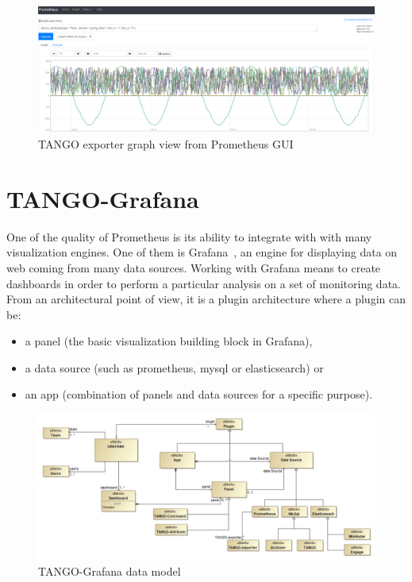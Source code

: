\documentclass[]{spie}  %
\begin{document}
\begin{figure}[!htb]
   \centering
   \includegraphics*[width=0.6\columnwidth]{exporter}
   \caption{TANGO exporter graph view from Prometheus GUI}
   \label{fig:exporter}
\end{figure}

\section{TANGO-Grafana}

One of the quality of Prometheus is its ability to integrate with with many visualization engines. One of them is Grafana~\cite{grafana}, an engine for displaying data on web coming from many data sources. Working with Grafana means to create dashboards in order to perform a particular analysis on a set of monitoring data. From an architectural point of view, it is a plugin architecture where a plugin can be: 
\begin{itemize}
    \item a panel (the basic visualization building block in Grafana),
    \item a data source (such as prometheus, mysql or elasticsearch) or 
    \item an app (combination of panels and data sources for a specific purpose).
\end{itemize}

\begin{figure}[!htb]
   \centering
   \includegraphics*[width=1\columnwidth]{TANGO-Grafana}
   \caption{TANGO-Grafana data model}
   \label{fig:tangografana}
\end{figure}
\end{document}
